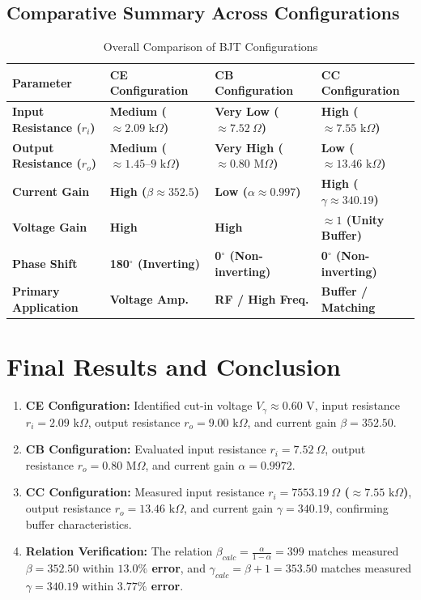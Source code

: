 \documentclass[11pt,a4paper]{article}
\begin{document}
\subsection{Comparative Summary Across Configurations}
\begin{table}[H]
\centering
\caption{Overall Comparison of BJT Configurations}
\begin{tabular}{p{3.5cm} p{3.2cm} p{3.2cm} p{3.2cm}}
\toprule
\textbf{Parameter} & \textbf{CE Configuration} & \textbf{CB Configuration} & \textbf{CC Configuration} \\
\midrule
\textbf{Input Resistance ($r_i$)} & \textbf{Medium ($\approx 2.09\text{ k}\Omega$)} & \textbf{Very Low ($\approx 7.52\ \Omega$)} & \textbf{High ($\approx 7.55\text{ k}\Omega$)} \\
\textbf{Output Resistance ($r_o$)} & \textbf{Medium ($\approx 1.45\text{--}9\text{ k}\Omega$)} & \textbf{Very High ($\approx 0.80\text{ M}\Omega$)} & \textbf{Low ($\approx 13.46\text{ k}\Omega$)} \\
\textbf{Current Gain} & \textbf{High ($\beta \approx 352.5$)} & \textbf{Low ($\alpha \approx 0.997$)} & \textbf{High ($\gamma \approx 340.19$)} \\
\textbf{Voltage Gain} & \textbf{High} & \textbf{High} & \textbf{$\approx 1$ (Unity Buffer)} \\
\textbf{Phase Shift} & \textbf{180$^\circ$ (Inverting)} & \textbf{0$^\circ$ (Non-inverting)} & \textbf{0$^\circ$ (Non-inverting)} \\
\textbf{Primary Application} & \textbf{Voltage Amp.} & \textbf{RF / High Freq.} & \textbf{Buffer / Matching} \\
\bottomrule
\end{tabular}
\end{table}
\section{Final Results and Conclusion}
\begin{enumerate}
    \item \textbf{CE Configuration:} Identified cut-in voltage \textbf{$V_\gamma \approx 0.60\text{ V}$}, input resistance \textbf{$r_i = 2.09\text{ k}\Omega$}, output resistance \textbf{$r_o = 9.00\text{ k}\Omega$}, and current gain \textbf{$\beta = 352.50$}.
    \item \textbf{CB Configuration:} Evaluated input resistance \textbf{$r_i = 7.52\ \Omega$}, output resistance \textbf{$r_o = 0.80\text{ M}\Omega$}, and current gain \textbf{$\alpha = 0.9972$}.
    \item \textbf{CC Configuration:} Measured input resistance \textbf{$r_i = 7553.19\ \Omega$ ($\approx 7.55\text{ k}\Omega$)}, output resistance \textbf{$r_o = 13.46\text{ k}\Omega$}, and current gain \textbf{$\gamma = 340.19$}, confirming buffer characteristics.
    \item \textbf{Relation Verification:} The relation \textbf{$\beta_{calc} = \frac{\alpha}{1-\alpha} = 399$} matches measured \textbf{$\beta = 352.50$} within \textbf{$13.0\%$ error}, and \textbf{$\gamma_{calc} = \beta + 1 = 353.50$} matches measured \textbf{$\gamma = 340.19$} within \textbf{$3.77\%$ error}.
\end{enumerate}
\end{document}
